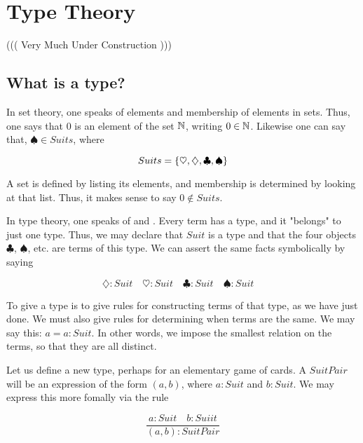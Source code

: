 
\begin{mathmacro}
\newcommand{\set}[1]{\{ #1 \}}
\newcommand{\nat}[0]{\mathbb{N}}
\end{mathmacro}

\section{Type Theory}

((( Very Much Under Construction )))

\innertableofcontents

\subsection{What is a type?}



In set theory, one speaks of elements and membership of elements in sets.  Thus, one says that $0$ is an element of the set $\nat$, writing $0 \in \nat$.  Likewise one can say that, $\spadesuit \in Suits$, where

$$ Suits = \set{\heartsuit, \diamondsuit, \clubsuit, \spadesuit }$$

A set is defined by listing its elements, and membership is determined by looking at that list.  Thus, it makes sense to say $0 \not\in Suits$.

In type theory, one speaks of  and .  Every term has a type, and it "belongs" to just one type.  Thus, we may declare that $Suit$ is a type and that the four objects $\clubsuit$, $\spadesuit$, etc. are terms of this type.  We can assert the same facts symbolically by saying

$$
\diamondsuit : Suit \quad
\heartsuit : Suit \quad
\clubsuit : Suit \quad
\spadesuit : Suit \quad
$$

To give a type is to give rules for constructing terms of that type, as we have just done.  We must also give rules for determining when terms are the same.  We may say this:  $a = a : Suit$.  In other words, we impose the smallest relation on the terms, so that they are all distinct.

Let us define a new type, perhaps for an elementary game of cards.  A $SuitPair$ will be an expression of the form $(a,b)$, where $a : Suit$ and $b : Suit$.  We may express this more fomally via the rule

$$
\frac{a : Suit \quad b : Suiit}{(a,b) : SuitPair}
$$

